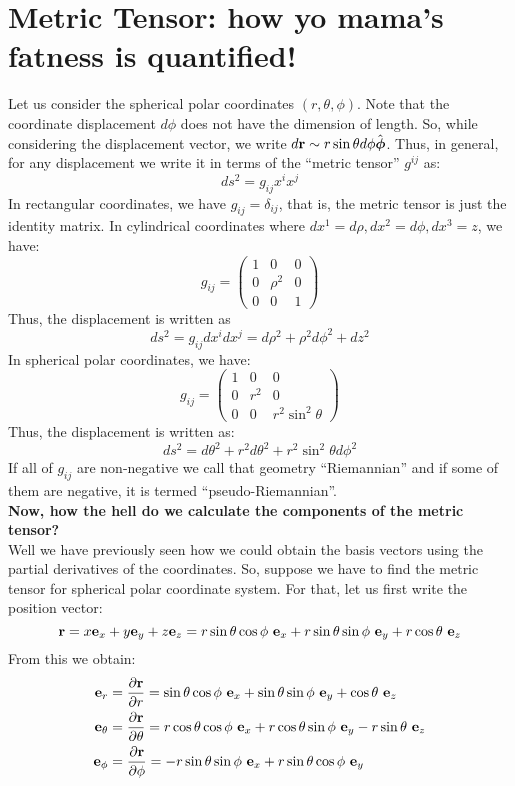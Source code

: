 \section{Metric Tensor: how yo mama's fatness is quantified!}
Let us consider the spherical polar coordinates $(r,\theta,\phi)$. Note that the coordinate displacement $d\phi$ does not have the dimension of length. So, while considering the displacement vector, we write $d\boldsymbol{\mathbf{r}} \sim r\sin\theta d\phi \hat{\boldsymbol{\mathbf{\phi}}}$. Thus, in general, for any displacement we write it in terms of the ``metric tensor'' $g^{ij}$ as:
$$ds^2 = g_{ij}x^ix^j$$
In rectangular coordinates, we have $g_{ij} = \delta_{ij}$, that is, the metric tensor is just the identity matrix. In cylindrical coordinates where $dx^1 = d\rho, dx^2 = d\phi, dx^3 = z$, we have:
$$g_{ij}= \begin{pmatrix}
    1 & 0 & 0\\
    0 & \rho^2 & 0\\
    0 & 0 & 1
\end{pmatrix}$$
Thus, the displacement is written as
$$ds^2 = g_{ij}dx^i dx^j = d\rho^2 + \rho^2 d\phi^2 + dz^2$$
In spherical polar coordinates, we have:
$$g_{ij} = \begin{pmatrix}
    1 & 0 & 0\\
    0 & r^2 & 0\\
    0 & 0 & r^2\sin^2\theta
\end{pmatrix}$$
Thus, the displacement is written as:
$$ds^2 = d\theta^2 + r^2 d\theta^2 + r^2\sin^2\theta d\phi^2$$
If all of $g_{ij}$ are non-negative we call that geometry ``Riemannian'' and if some of them are negative, it is termed ``pseudo-Riemannian''.\\[0.3cm]
\textbf{Now, how the hell do we calculate the components of the metric tensor?}\\[0.3cm]
Well we have previously seen how we could obtain the basis vectors using the partial derivatives of the coordinates. So, suppose we have to find the metric tensor for spherical polar coordinate system. For that, let us first write the position vector:
$$\veb{r} = x \veb{e}_x+y \veb{e}_y+z \veb{e}_z = r \sin\theta \cos\phi \ \veb{e}_x + r \sin\theta \sin\phi \ \veb{e}_y + r \cos\theta \ \veb{e}_z$$
From this we obtain:
\begin{align*}
    \veb{e}_r &= \pdv{\veb{r}}{r} =  \sin\theta \cos\phi \ \veb{e}_x + \sin\theta \sin\phi \ \veb{e}_y + \cos\theta \ \veb{e}_z\\
    \veb{e}_\theta &= \pdv{\veb{r}}{\theta} = r \cos\theta \cos\phi \ \veb{e}_x + r \cos\theta \sin\phi \ \veb{e}_y - r \sin\theta \ \veb{e}_z\\
    \veb{e}_\phi &= \pdv{\veb{r}}{\phi} = -r \sin\theta \sin\phi \ \veb{e}_x + r \sin\theta \cos\phi \ \veb{e}_y
\end{align*}
